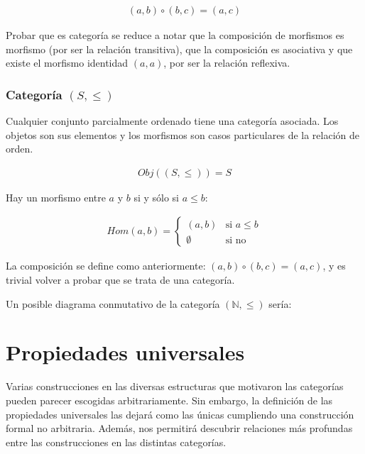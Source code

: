 \documentclass[11pt, fleqn, spanish]{book}
\newcommand{\twopartdef}[4]
{
  \left\{
    \begin{array}{ll}
      #1 & \mbox{si } #2 \\
      #3 & \mbox{si } #4
    \end{array}
  \right.
}
\begin{document}
\begin{align*}
  (a,b) \circ (b,c) = (a,c)
\end{align*}

Probar que es categoría se reduce a notar que la composición de
morfismos es morfismo (por ser la relación transitiva), que la
composición es asociativa y que existe el morfismo identidad $(a,a)$,
por ser la relación reflexiva.
     
\subsection{Categoría \texttt{$(S,\leq)$}}
Cualquier conjunto parcialmente ordenado tiene una categoría asociada. Los objetos
son sus elementos y los morfismos son casos particulares de la relación de orden.

\begin{gather*}
  Obj((S,\leq)) = S
\end{gather*}

Hay un morfismo entre $a$ y $b$ si y sólo si $a \leq b$:

\begin{align*}
  Hom(a,b)= \twopartdef{(a,b)}{a \leq b}{\emptyset}{\mbox{no}}
\end{align*}

La composición se define como anteriormente: $(a,b) \circ (b,c) = (a,c)$, y es
trivial volver a probar que se trata de una categoría.
\medskip

Un posible diagrama conmutativo de la categoría \texttt{$(\mathbb{N},\leq)$} sería:

\begin{center}
\end{center}
 

\chapter{Propiedades universales}
  Varias construcciones en las diversas estructuras que motivaron las categorías pueden parecer
  escogidas arbitrariamente. Sin embargo, la definición de las propiedades universales las dejará
  como las únicas cumpliendo una construcción formal no arbitraria. Además, nos permitirá descubrir
  relaciones más profundas entre las construcciones en las distintas categorías.
  
\end{document}
